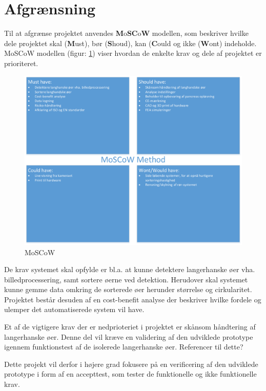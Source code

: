 \section{Afgrænsning}
Til at afgrænse projektet anvendes \textbf{M}o\textbf{SC}o\textbf{W} modellen, som beskriver hvilke dele projektet skal (\textbf{M}ust), bør (\textbf{S}houd), kan (\textbf{C}ould og ikke (\textbf{W}ont) indeholde. MoSCoW modellen (figur: \ref{fig:moscow}) viser hvordan de enkelte krav og dele af projektet er prioriteret. 


\begin{figure}[H]
	\centering
	\includegraphics[width=1\textwidth]{billeder/MoSCoW-crop.pdf}
	\caption{MoSCoW}
	\label{fig:moscow}
\end{figure}

De krav systemet skal opfylde er bl.a. at kunne detektere langerhanske øer vha. billedprocessering, samt sortere øerne ved detektion. Herudover skal systemet kunne gemme data omkring de sorterede øer herunder størrelse og cirkularitet. Projektet består desuden af en cost-benefit analyse der beskriver hvilke fordele og ulemper det automatiserede system vil have. 

Et af de vigtigere krav der er nedprioteriet i projektet er skånsom håndtering af langerhanske øer. Denne del vil kræve en validering af den udviklede prototype igennem funktionstest af de isolerede langerhanske øer. Referencer til dette?

Dette projekt vil derfor i højere grad fokusere på en verificering af den udviklede prototype i form af en accepttest, som tester de funktionelle og ikke funktionelle krav.

